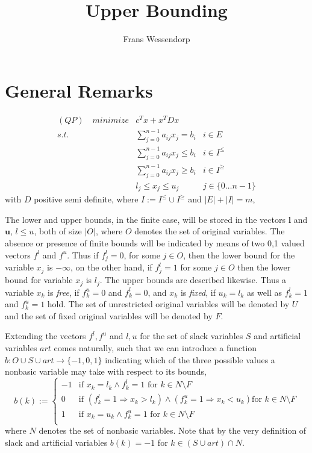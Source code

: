 \documentclass[a4paper]{article}
\title{Upper Bounding}
\author{Frans Wessendorp}
\begin{document}
\maketitle
\section{General Remarks}
\begin{eqnarray}
\label{def:QP_UB}
(QP)\quad minimize&  c^{T}x + x^{T} D x      	&  \nonumber \\
s.t.	 & \sum_{j=0}^{n-1}a_{ij}x_{j} = b_{i}	& i \in E  \nonumber \\
	 & \sum_{j=0}^{n-1}a_{ij}x_{j} \leq b_{i} & i \in I^{\leq} \\
	 & \sum_{j=0}^{n-1}a_{ij}x_{j} \geq b_{i} & i \in I^{\geq}  \nonumber \\
 	 & \mathit{l}_{j} \leq x_{j} \leq u_{j}	  & j \in \{0 \ldots n-1 \}
	 \nonumber
\end{eqnarray}
with $D$ positive semi definite, where $I:= I^{\leq} \cup I^{\geq}$ and
$\left| E \right| + \left| I \right| = m$,

The lower and upper bounds, in the finite case,  will be stored in the vectors
$\mathbf{l}$ and $\mathbf{u}$, $l \leq u$, both of size $\left|O\right|$, where $O$ denotes the set of original variables. The absence or presence of finite bounds will be indicated by means of two 0,1 valued vectors $f^{l}$ and $f^{u}$. Thus if 
$f_{j}^{l}=0$, for some $j \in O$, then the lower bound for the variable $x_{j}$ is $-\infty$, on the other hand, if $f_{j}^{l}=1$ for some $j \in O$ then the lower bound for variable $x_{j}$ is $l_{j}$. The upper bounds are described 
likewise. Thus a variable $x_{k}$ is \emph{free}, if $f_{k}^{u}=0$ and
$f_{k}^{l}=0$, and $x_{k}$ is \emph{fixed}, if $u_{k}=l_{k}$ as well as
$f_{k}^{l}=1$ and $f_{k}^{u}=1$ hold. The set of unrestricted original variables will be denoted by $U$ and the set of fixed original variables will be denoted by $F$.

Extending the vectors $f^{l}, f^{u}$ and $l, u$ for the set of slack variables $S$ and artificial variables $art$ comes naturally, such that we can introduce  
a function $b: O \cup S \cup art \rightarrow \{-1, 0, 1\}$ indicating which of the three possible values a nonbasic variable may take with respect to its bounds,
\begin{equation}
b(k):= \left\{
\begin{array}{ll}
-1
&
\mbox{if $x_{k}=l_{k} \wedge f_{k}^{l}=1$ for $k \in N \setminus F$} \\
0
&
\mbox{if $\left(f_{k}^{l}=1 \Rightarrow x_{k} > l_{k}\right) \wedge
          \left(f_{k}^{u}=1 \Rightarrow x_{k} < u_{k}\right)$
          for $k \in N \setminus F$} \\
1
&
\mbox{if $x_{k}=u_{k} \wedge f_{k}^{u}=1$ for $k \in N \setminus F$} \\
\end{array}
\right.
\end{equation}
where $N$ denotes the set of nonbasic variables. Note that by the very definition of slack and artificial variables $b(k)=-1$ for
$k \in (S \cup art) \cap N$.   
\end{document}
